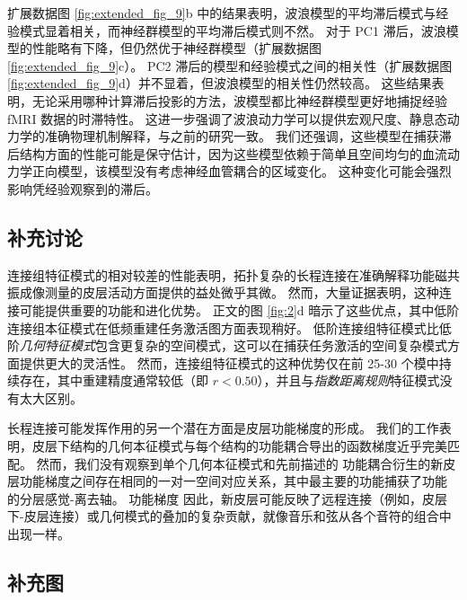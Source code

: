 \documentclass[lang=cn,a4paper,newtx]{elegantpaper}
\begin{document}
扩展数据图 \ref{fig:extended_fig_9}b 中的结果表明，波浪模型的平均滞后模式与经验模式显着相关，而神经群模型的平均滞后模式则不然。
对于 PC1 滞后，波浪模型的性能略有下降，但仍然优于神经群模型（扩展数据图 \ref{fig:extended_fig_9}c）。
PC2 滞后的模型和经验模式之间的相关性（扩展数据图 \ref{fig:extended_fig_9}d）并不显着，但波浪模型的相关性仍然较高。
这些结果表明，无论采用哪种计算滞后投影的方法，波模型都比神经群模型更好地捕捉经验 fMRI 数据的时滞特性。
这进一步强调了波浪动力学可以提供宏观尺度、静息态动力学的准确物理机制解释，与之前的研究一致\cite{robinson2021determination,majeed2011spatiotemporal,matsui2016transient}。
我们还强调，这些模型在捕获滞后结构方面的性能可能是保守估计，因为这些模型依赖于简单且空间均匀的血流动力学正向模型，该模型没有考虑神经血管耦合的区域变化\cite{deco2021dynamical,henderson2022empirical,fischl2012freesurfer}。
这种变化可能会强烈影响凭经验观察到的滞后。


\subsection{补充讨论} \label{sec:supplementary_discussion}

连接组特征模式的相对较差的性能表明，拓扑复杂的长程连接在准确解释功能磁共振成像测量的皮层活动方面提供的益处微乎其微。
然而，大量证据表明，这种连接可能提供重要的功能和进化优势\cite{oldham2020efficacy,arslan2018human,tokariev2019large}。
正文的图 \ref{fig:2}d 暗示了这些优点，其中低阶连接组本征模式在低频重建任务激活图方面表现稍好。
低阶连接组特征模式比低阶\textit{几何特征模式}包含更复杂的空间模式，这可以在捕获任务激活的空间复杂模式方面提供更大的灵活性。
然而，连接组特征模式的这种优势仅在前 25-30 个模中持续存在，其中重建精度通常较低（即 $ r < 0.50 $），并且与\textit{指数距离规则}特征模式没有太大区别。


长程连接可能发挥作用的另一个潜在方面是皮层功能梯度的形成。
我们的工作表明，皮层下结构的几何本征模式与每个结构的功能耦合导出的函数梯度近乎完美匹配。
然而，我们没有观察到单个几何本征模式和先前描述的 功能耦合衍生的新皮层功能梯度之间存在相同的一对一空间对应关系，其中最主要的功能捕获了功能\cite{chen2022individuality} 的分层感觉-离去轴。
功能梯度 因此，新皮层可能反映了远程连接（例如，皮层下-皮层连接）或几何模式\cite{bolt2022parsimonious}的叠加的复杂贡献，就像音乐和弦从各个音符的组合中出现一样。



\subsection{补充图}
\end{document}
